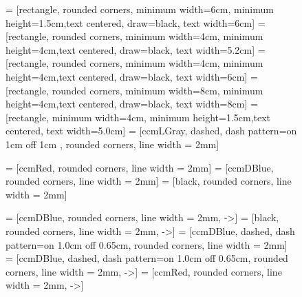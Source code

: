 \begin{figure}[!htb]
    \centering

     = [rectangle, rounded corners, minimum width=6cm, minimum height=1.5cm,text centered, draw=black, text width=6cm]
     = [rectangle, rounded corners, minimum width=4cm, minimum height=4cm,text centered, draw=black, text width=5.2cm]
     = [rectangle, rounded corners, minimum width=4cm, minimum height=4cm,text centered, draw=black, text width=6cm]
     = [rectangle, rounded corners, minimum width=8cm, minimum height=4cm,text centered, draw=black, text width=8cm]
     = [rectangle, minimum width=4cm, minimum height=1.5cm,text centered, text width=5.0cm]
     = [ccmLGray, dashed, dash pattern=on 1cm off 1cm , rounded corners, line width = 2mm]

     = [ccmRed, rounded corners, line width = 2mm]
     = [ccmDBlue, rounded corners, line width = 2mm]
     = [black, rounded corners, line width = 2mm]
    
     = [ccmDBlue, rounded corners, line width = 2mm, ->]
     = [black, rounded corners, line width = 2mm, ->]
     = [ccmDBlue, dashed, dash pattern=on 1.0cm off 0.65cm, rounded corners, line width = 2mm]
     = [ccmDBlue, dashed, dash pattern=on 1.0cm off 0.65cm, rounded corners, line width = 2mm, ->]
     = [ccmRed, rounded corners, line width = 2mm, ->]
    
\end{figure}
